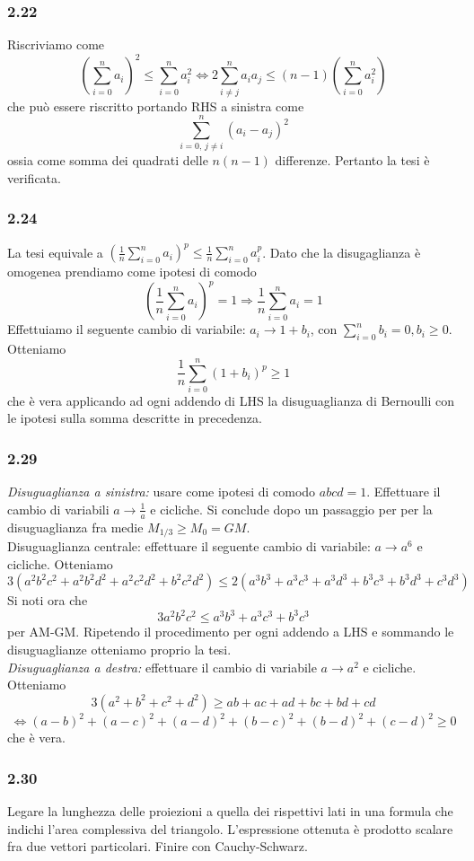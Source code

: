 \documentclass[a4paper,11pt]{article}
\newcommand{\ex}[1]{\subsubsection*{#1}}
\begin{document}
\ex{2.22}
Riscriviamo come $$\left(\sum_{i=0}^na_i\right)^2\le\sum_{i=0}^{n}a_i^2\Leftrightarrow 2\sum_{i\neq j}^{n}a_ia_j\le (n-1)\left(\sum_{i=0}^{n}a_i^2\right)$$ 
che può essere riscritto portando RHS a sinistra come $$\sum_{i=0,\, j\neq i}^{n} (a_i-a_j)^2$$ ossia come somma dei quadrati delle $n(n-1)$ differenze. Pertanto la tesi è verificata.
\ex{2.24}
La tesi equivale a $(\frac{1}{n}\sum_{i=0}^na_i)^p\le \frac{1}{n}\sum_{i=0}^na_i^p$.
Dato che la disugaglianza è omogenea prendiamo come ipotesi di comodo $$\left(\frac{1}{n}\sum_{i=0}^na_i\right)^p=1\Rightarrow \frac{1}{n}\sum_{i=0}^na_i=1$$Effettuiamo il seguente cambio di variabile: $a_i\rightarrow 1+b_i$, con $\sum_{i=0}^nb_i=0,b_i\ge 0$. Otteniamo $$\frac{1}{n}\sum_{i=0}^n\left(1+b_i\right)^p\ge 1$$ che è vera applicando ad ogni addendo di LHS la disuguaglianza di Bernoulli con le ipotesi sulla somma descritte in precedenza.
\ex{2.29} 
{\it Disuguaglianza a sinistra:} usare come ipotesi di comodo $abcd=1$. Effettuare il cambio di variabili $a \rightarrow \frac {1} {a}$ e cicliche. Si conclude dopo un passaggio per per la disuguaglianza fra medie $M_{1/3}\ge M_0=GM$.\\
Disuguaglianza centrale: effettuare il seguente cambio di variabile: $a\rightarrow a^6$ e cicliche.
Otteniamo $$3(a^2 b^2 c^2+a^2 b^2 d^2+a^2 c^2 d^2+b^2 c^2 d^2)\le 2(a^3 b^3+a^3 c^3+a^3 d^3+b^3 c^3+b^3 d^3+c^3 d^3)$$Si noti ora che $$3a^2 b^2 c^2\le  a^3b^3+a^3c^3+b^3c^3$$ per AM-GM. 
Ripetendo il procedimento per ogni addendo a LHS e sommando le disuguaglianze otteniamo proprio la tesi.\\
{\it Disuguaglianza a destra:} effettuare il cambio di variabile $a\rightarrow a^2$ e cicliche. Otteniamo $$3(a^2+b^2+c^2+d^2)\ge ab+ac+ad+bc+bd+cd$$ $$\Leftrightarrow (a-b)^2+(a-c)^2+(a-d)^2+(b-c)^2+(b-d)^2+(c-d)^2\ge 0$$ che è vera.

\ex{2.30}
Legare la lunghezza delle proiezioni a quella dei rispettivi lati in una formula che indichi l'area complessiva del triangolo. 
L'espressione ottenuta è prodotto scalare fra due vettori particolari. Finire con Cauchy-Schwarz.
\end{document}
